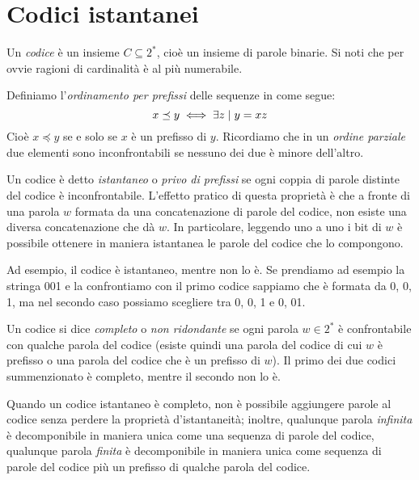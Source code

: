\section{Codici istantanei}
Un \textit{codice} è un insieme $C \subseteq 2^*$, cioè un insieme di parole binarie. Si noti che per ovvie ragioni di cardinalità  è al più numerabile.

Definiamo l'\textit{ordinamento per prefissi} delle sequenze in  come segue:
\begin{equation}
    x \preceq y \iff \exists z \hspace{1mm}|\hspace{1mm} y = xz
\end{equation}
Cioè $x \preceq y$ se e solo se $x$ è un prefisso di $y$. Ricordiamo che in un \textit{ordine parziale} due elementi sono inconfrontabili se nessuno dei due è minore dell'altro.

Un codice è detto \textit{istantaneo} o \textit{privo di prefissi} se ogni coppia di parole distinte del codice è inconfrontabile. L'effetto pratico di questa proprietà è che a fronte di una parola $w$ formata da una concatenazione di parole del codice, non esiste una diversa concatenazione che dà $w$. In particolare, leggendo uno a uno i bit di $w$ è possibile ottenere in maniera istantanea le parole del codice che lo compongono.

Ad esempio, il codice  è istantaneo, mentre  non lo è. Se prendiamo ad esempio la stringa 001 e la confrontiamo con il primo codice sappiamo che è formata da 0, 0, 1, ma nel secondo caso possiamo scegliere tra 0, 0, 1 e 0, 01.

Un codice si dice \textit{completo} o \textit{non ridondante} se ogni parola $w \in 2^*$ è confrontabile con qualche parola del codice (esiste quindi una parola del codice di cui $w$ è prefisso o una parola del codice che è un prefisso di $w$). Il primo dei due codici summenzionato è completo, mentre il secondo non lo è.

Quando un codice istantaneo è completo, non è possibile aggiungere parole al codice senza perdere la proprietà d'istantaneità; inoltre, qualunque parola \textit{infinita} è decomponibile in maniera unica come una sequenza di parole del codice, qualunque parola \textit{finita} è decomponibile in maniera unica come sequenza di parole del codice più un prefisso di qualche parola del codice.

